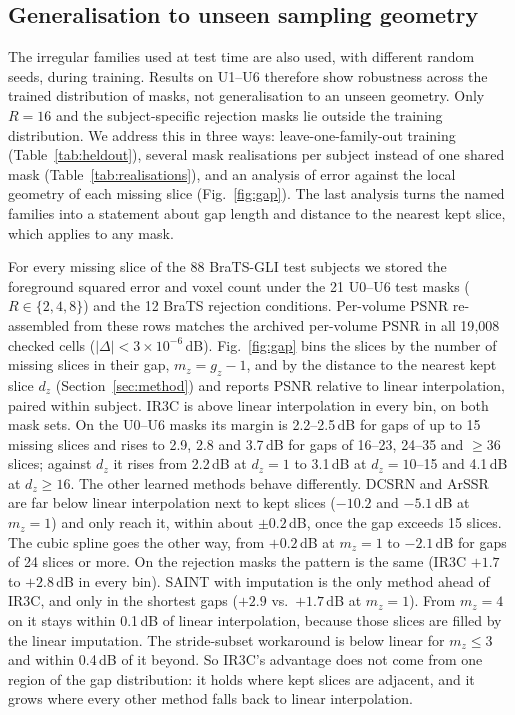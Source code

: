 \documentclass[a4paper,fleqn]{cas-dc}
\begin{document}
\subsection{Generalisation to unseen sampling geometry}
\label{sec:pending-heldout}

The irregular families used at test time are also used, with different random seeds, during
training. Results on U1--U6 therefore show robustness across the trained distribution of
masks, not generalisation to an unseen geometry. Only $R=16$ and the subject-specific
rejection masks lie outside the training distribution. We address this in three ways:
leave-one-family-out training (Table~\ref{tab:heldout}), several mask realisations per
subject instead of one shared mask (Table~\ref{tab:realisations}), and an analysis of error
against the local geometry of each missing slice (Fig.~\ref{fig:gap}). The last analysis turns the named families into a statement about gap length and
distance to the nearest kept slice, which applies to any mask.

For every missing slice of the 88 BraTS-GLI test subjects we stored the foreground squared
error and voxel count under the 21 U0--U6 test masks ($R\in\{2,4,8\}$) and the 12 BraTS
rejection conditions. Per-volume PSNR re-assembled from these rows matches the archived
per-volume PSNR in all 19{,}008 checked cells ($|\Delta|<3\times10^{-6}$\,dB). Fig.~\ref{fig:gap}
bins the slices by the number of missing slices in their gap, $m_z=g_z-1$, and by the
distance to the nearest kept slice $d_z$ (Section~\ref{sec:method})
and reports PSNR relative to linear interpolation, paired within subject. IR3C is above
linear interpolation in every bin, on both mask sets. On the U0--U6 masks its margin is
2.2--2.5\,dB for gaps of up to 15 missing slices and rises to 2.9, 2.8 and 3.7\,dB for gaps of
16--23, 24--35 and $\ge36$ slices; against $d_z$ it rises from 2.2\,dB at $d_z=1$ to 3.1\,dB at
$d_z=10$--15 and 4.1\,dB at $d_z\ge16$. The other learned methods behave differently. DCSRN and
ArSSR are far below linear interpolation next to kept slices ($-10.2$ and $-5.1$\,dB at
$m_z=1$) and only reach it, within about $\pm0.2$\,dB, once the gap exceeds 15 slices. The
cubic spline goes the other way, from $+0.2$\,dB at $m_z=1$ to $-2.1$\,dB for gaps of 24 slices or
more. On the rejection masks the pattern is the same (IR3C $+1.7$ to $+2.8$\,dB in every bin).
SAINT with imputation is the only method ahead of IR3C, and only in the shortest gaps
($+2.9$ vs.\ $+1.7$\,dB at $m_z=1$). From $m_z=4$ on it stays within 0.1\,dB of linear
interpolation, because those slices are filled by the linear imputation. The stride-subset
workaround is below linear for $m_z\le3$ and within 0.4\,dB of it beyond. So IR3C's advantage
does not come from one region of the gap distribution: it holds where kept slices are
adjacent, and it grows where every other method falls back to linear interpolation.
\end{document}
